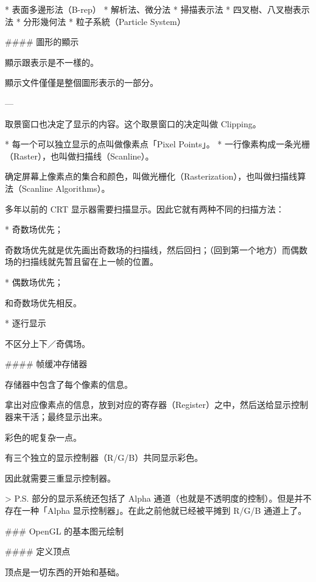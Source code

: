 \documentclass[
]{article}
\newenvironment{Shaded}{}{}
\newcommand{\DataTypeTok}[1]{\textcolor[rgb]{0.56,0.13,0.00}{#1}}
\newcommand{\FunctionTok}[1]{\textcolor[rgb]{0.02,0.16,0.49}{#1}}
\newcommand{\NormalTok}[1]{#1}
\newcommand{\StringTok}[1]{\textcolor[rgb]{0.25,0.44,0.63}{#1}}
\begin{document}
\begin{Shaded}
\begin{Highlighting}[]
\NormalTok{* }\StringTok{表面多邊形法（B-rep）}
\StringTok{* 解析法、微分法}
\StringTok{* 掃描表示法}
\StringTok{* 四叉樹、八叉樹表示法}
\StringTok{* 分形幾何法}
\StringTok{* 粒子系統（Particle System）}

\FunctionTok{#### 圖形的顯示}

\NormalTok{顯示跟表示是不一樣的。}

\NormalTok{顯示文件僅僅是整個圖形表示的一部分。}

\NormalTok{---}


\NormalTok{取景窗口也决定了显示的内容。这个取景窗口的决定叫做 Clipping。}

\NormalTok{* }\StringTok{每一个可以独立显示的点叫做像素点「Pixel Points」。}
\StringTok{* 一行像素构成一条光栅（Raster），也叫做扫描线（Scanline）。}

\NormalTok{确定屏幕上像素点的集合和颜色，叫做光栅化（Rasterization），也叫做扫描线算法（Scanline Algorithms）。}


\NormalTok{多年以前的 CRT 显示器需要扫描显示。因此它就有两种不同的扫描方法：}

\NormalTok{* }\StringTok{奇数场优先；}

\NormalTok{奇数场优先就是优先画出奇数场的扫描线，然后回扫；（回到第一个地方）而偶数场的扫描线就先暂且留在上一帧的位置。}

\NormalTok{* }\StringTok{偶数场优先；}

\NormalTok{和奇数场优先相反。}

\NormalTok{* }\StringTok{逐行显示}

\NormalTok{不区分上下／奇偶场。}

\FunctionTok{#### 帧缓冲存储器}

\NormalTok{存储器中包含了每个像素的信息。}

\NormalTok{拿出对应像素点的信息，放到对应的寄存器（Register）之中，然后送给显示控制器来干活；最终显示出来。}

\NormalTok{彩色的呢复杂一点。}

\NormalTok{有三个独立的显示控制器（R/G/B）共同显示彩色。}

\NormalTok{因此就需要三重显示控制器。}

\NormalTok{>}\DataTypeTok{ P.S. 部分的显示系统还包括了 Alpha 通道（也就是不透明度的控制）。但是并不存在一种「Alpha 显示控制器」。在此之前他就已经被平摊到 R/G/B 通道上了。}

\FunctionTok{### OpenGL 的基本图元绘制}

\FunctionTok{#### 定义顶点}

\NormalTok{顶点是一切东西的开始和基础。}


\end{Highlighting}
\end{Shaded}
\end{document}

